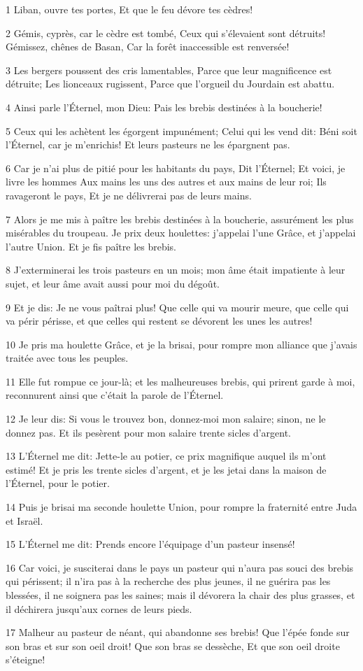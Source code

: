 \par 1 Liban, ouvre tes portes, Et que le feu dévore tes cèdres!
\par 2 Gémis, cyprès, car le cèdre est tombé, Ceux qui s'élevaient sont détruits! Gémissez, chênes de Basan, Car la forêt inaccessible est renversée!
\par 3 Les bergers poussent des cris lamentables, Parce que leur magnificence est détruite; Les lionceaux rugissent, Parce que l'orgueil du Jourdain est abattu.
\par 4 Ainsi parle l'Éternel, mon Dieu: Pais les brebis destinées à la boucherie!
\par 5 Ceux qui les achètent les égorgent impunément; Celui qui les vend dit: Béni soit l'Éternel, car je m'enrichis! Et leurs pasteurs ne les épargnent pas.
\par 6 Car je n'ai plus de pitié pour les habitants du pays, Dit l'Éternel; Et voici, je livre les hommes Aux mains les uns des autres et aux mains de leur roi; Ils ravageront le pays, Et je ne délivrerai pas de leurs mains.
\par 7 Alors je me mis à paître les brebis destinées à la boucherie, assurément les plus misérables du troupeau. Je prix deux houlettes: j'appelai l'une Grâce, et j'appelai l'autre Union. Et je fis paître les brebis.
\par 8 J'exterminerai les trois pasteurs en un mois; mon âme était impatiente à leur sujet, et leur âme avait aussi pour moi du dégoût.
\par 9 Et je dis: Je ne vous paîtrai plus! Que celle qui va mourir meure, que celle qui va périr périsse, et que celles qui restent se dévorent les unes les autres!
\par 10 Je pris ma houlette Grâce, et je la brisai, pour rompre mon alliance que j'avais traitée avec tous les peuples.
\par 11 Elle fut rompue ce jour-là; et les malheureuses brebis, qui prirent garde à moi, reconnurent ainsi que c'était la parole de l'Éternel.
\par 12 Je leur dis: Si vous le trouvez bon, donnez-moi mon salaire; sinon, ne le donnez pas. Et ils pesèrent pour mon salaire trente sicles d'argent.
\par 13 L'Éternel me dit: Jette-le au potier, ce prix magnifique auquel ils m'ont estimé! Et je pris les trente sicles d'argent, et je les jetai dans la maison de l'Éternel, pour le potier.
\par 14 Puis je brisai ma seconde houlette Union, pour rompre la fraternité entre Juda et Israël.
\par 15 L'Éternel me dit: Prends encore l'équipage d'un pasteur insensé!
\par 16 Car voici, je susciterai dans le pays un pasteur qui n'aura pas souci des brebis qui périssent; il n'ira pas à la recherche des plus jeunes, il ne guérira pas les blessées, il ne soignera pas les saines; mais il dévorera la chair des plus grasses, et il déchirera jusqu'aux cornes de leurs pieds.
\par 17 Malheur au pasteur de néant, qui abandonne ses brebis! Que l'épée fonde sur son bras et sur son oeil droit! Que son bras se dessèche, Et que son oeil droite s'éteigne!

